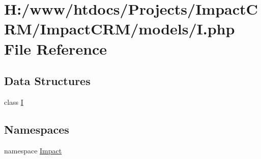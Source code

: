 \hypertarget{I_8php}{
\section{H:/www/htdocs/Projects/ImpactCRM/ImpactCRM/models/I.php File Reference}
\label{I_8php}
}
\subsection*{Data Structures}
\begin{DoxyCompactItemize}
\item 
class \hyperlink{classI}{I}
\end{DoxyCompactItemize}
\subsection*{Namespaces}
\begin{DoxyCompactItemize}
\item 
namespace \hyperlink{namespaceImpact}{Impact}
\end{DoxyCompactItemize}
